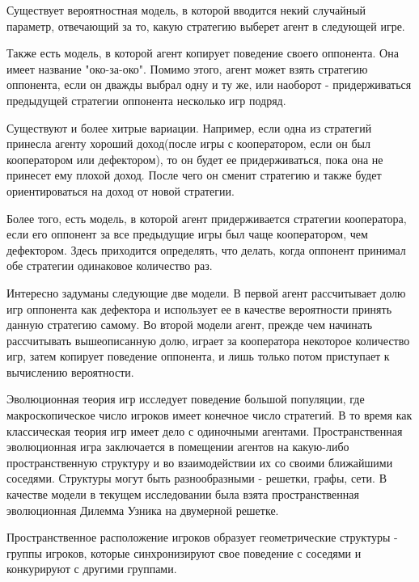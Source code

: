 \documentclass[12pt,a4paper]{article}
\begin{document}
	\par Существует вероятностная модель, в которой вводится некий случайный параметр, отвечающий за то, какую стратегию выберет агент в следующей игре.
	
	\par Также есть модель, в которой агент копирует поведение своего оппонента. Она имеет название "око-за-око". Помимо этого, агент может взять стратегию оппонента, если он дважды выбрал одну и ту же, или наоборот - придерживаться предыдущей стратегии оппонента несколько игр подряд.
	
	\par Существуют и более хитрые вариации. Например, если одна из стратегий принесла агенту хороший доход(после игры с кооператором, если он был кооператором или дефектором), то он будет ее придерживаться, пока она не принесет ему плохой доход. После чего он сменит стратегию и также будет ориентироваться на доход от новой стратегии. 
	
	\par Более того, есть модель, в которой агент придерживается стратегии кооператора, если его оппонент за все предыдущие игры был чаще кооператором, чем дефектором. Здесь приходится определять, что делать, когда оппонент принимал обе стратегии одинаковое количество раз. 
	
	\par Интересно задуманы следующие две модели. В первой агент рассчитывает долю игр оппонента как дефектора и использует ее в качестве вероятности принять данную стратегию самому. Во второй модели агент, прежде чем начинать рассчитывать вышеописанную долю, играет за кооператора некоторое количество игр, затем копирует поведение оппонента, и лишь только потом приступает к вычислению вероятности.
	
	\par Эволюционная теория игр исследует поведение большой популяции, где макроскопическое
	число игроков имеет конечное число стратегий. В то время как классическая теория игр имеет дело с одиночными агентами. Пространственная эволюционная игра заключается в помещении агентов на какую-либо пространственную структуру и во взаимодействии их со своими ближайшими соседями. Структуры могут быть разнообразными - решетки, графы, сети. В качестве модели в текущем исследовании была взята пространственная эволюционная Дилемма Узника на двумерной решетке.
	
	\par Пространственное расположение игроков образует геометрические структуры - группы игроков, которые синхронизируют свое поведение с соседями и конкурируют с другими группами.
	 
\end{document}
